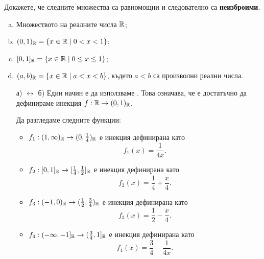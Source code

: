 \begin{problem}
  Докажете, че следните множества са равномощни и следователно са {\bf неизброими}.
  \begin{enumerate}[a)]
  \item
    Множеството на реалните числа $\mathbb{R}$;
  \item
    $(0,1)_{\mathbb{R}} = \{x \in \mathbb{R} \mid 0 < x < 1\}$;
  \item
    $[0,1]_{\mathbb{R}} = \{x \in \mathbb{R} \mid 0 \leq x \leq 1\}$;
  \item
    $(a,b)_{\mathbb{R}} = \{x \in \mathbb{R} \mid a < x < b\}$, където $a<b$ са произволни реални числа.
  \end{enumerate}
\end{problem}
\begin{hint}
  \begin{enumerate}
  \item[а) $\leftrightarrow$ б)]
    Един начин е да използваме . Това означава, че е достатъчно да дефинираме инекция $f:\mathbb{R} \to (0,1)_{\mathbb{R}}$.

    Да разгледаме следните функции:
    \begin{itemize}
    \item 
      $f_1: (1,\infty)_{\mathbb{R}} \to (0,\frac{1}{4})_{\mathbb{R}}$ е инекция дефинирана като
      \[f_1(x) = \frac{1}{4x}.\]
    \item
      $f_2: [0,1]_{\mathbb{R}} \to [\frac{1}{4},\frac{1}{2}]_{\mathbb{R}}$ е инекция дефинирана като
      \[f_2(x) = \frac{1}{4} + \frac{x}{4}.\]
    \item
      $f_3: (-1,0)_{\mathbb{R}} \to (\frac{1}{2},\frac{3}{4})_{\mathbb{R}}$ е инекция дефинирана като
      \[f_3(x) = \frac{1}{2} - \frac{x}{4}.\]
    \item
      $f_4: (-\infty,-1]_{\mathbb{R}} \to (\frac{3}{4},1]_{\mathbb{R}}$ е инекция дефинирана като
      \[f_4(x) = \frac{3}{4} - \frac{1}{4x}.\]
    \end{itemize}


\end{enumerate}
\end{hint}
